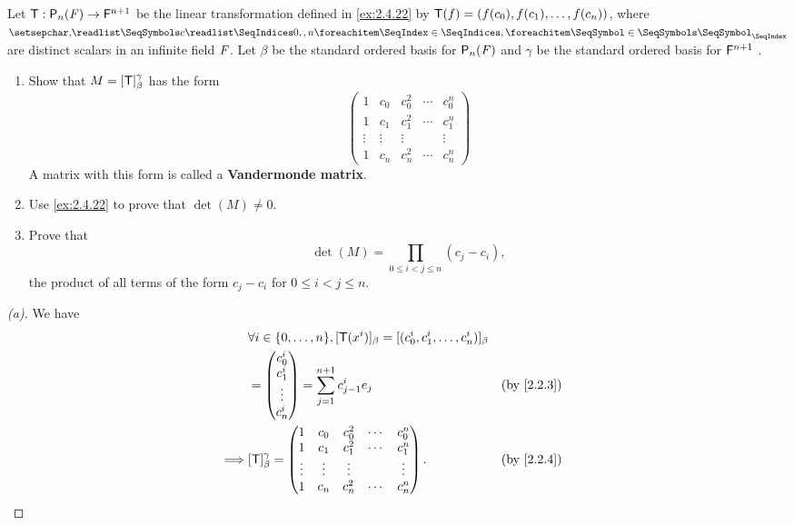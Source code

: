 \begin{ex}\label{ex:4.3.22}
	Let \(\T : \ps[n]{\F} \to \vs{F}^{n + 1}\) be the linear transformation defined in \cref{ex:2.4.22} by \(\mathsf{T}(f) = (f(c_0), f(c_1), \dots, f(c_n))\), where \(\seq{c}{0,,n}\) are distinct scalars in an infinite field \(\mathit{F}\).
	Let \(\beta\) be the standard ordered basis for \(\ps[n]{\F}\) and \(\gamma\) be the standard ordered basis for \(\mathsf{F}^{n + 1}\) .
	\begin{enumerate}
		\item Show that \(M = [\mathsf{T}]_{\beta}^{\gamma}\) has the form
		      \[
			      \begin{pmatrix}
				      1      & c_0    & c_0^2  & \cdots & c_0^n  \\
				      1      & c_1    & c_1^2  & \cdots & c_1^n  \\
				      \vdots & \vdots & \vdots &        & \vdots \\
				      1      & c_n    & c_n^2  & \cdots & c_n^n
			      \end{pmatrix}
		      \]
		      A matrix with this form is called a \textbf{Vandermonde matrix}.
		\item Use \cref{ex:2.4.22} to prove that \(\det(M) \neq 0\).
		\item Prove that
		      \[
			      \det(M) = \prod_{0 \leq i < j \leq n} (c_j - c_i),
		      \]
		      the product of all terms of the form \(c_j - c_i\) for \(0 \leq i < j \leq n\).
	\end{enumerate}
\end{ex}

\begin{proof}[(a)]
	We have
	\begin{align*}
		         & \forall i \in \set{0, \dots, n}, [\T(x^i)]_{\beta} = [(c_0^i, c_1^i, \dots, c_n^i)]_{\beta}                   \\
		         & = \begin{pmatrix}
			             c_0^i  \\
			             c_1^i  \\
			             \vdots \\
			             c_n^i
		             \end{pmatrix} = \sum_{j = 1}^{n + 1} c_{j - 1}^i e_j                                        &  & \by{2.2.3} \\
		\implies & [\T]_{\beta}^{\gamma} = \begin{pmatrix}
			                                   1      & c_0    & c_0^2  & \cdots & c_0^n  \\
			                                   1      & c_1    & c_1^2  & \cdots & c_1^n  \\
			                                   \vdots & \vdots & \vdots &        & \vdots \\
			                                   1      & c_n    & c_n^2  & \cdots & c_n^n
		                                   \end{pmatrix}.                                               &  & \by{2.2.4}
	\end{align*}
\end{proof}

